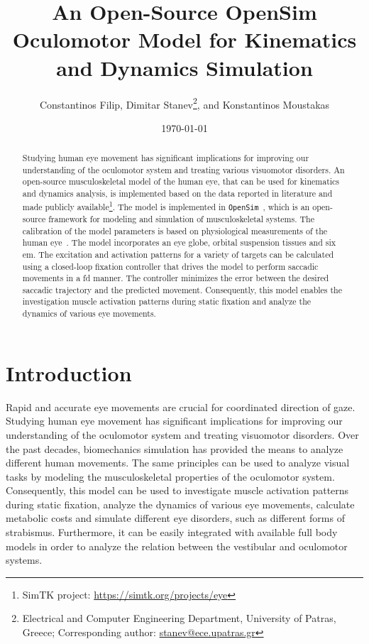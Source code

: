 \documentclass[11pt,a4paper,draft=false]{report}
\title{An Open-Source OpenSim Oculomotor Model for Kinematics and Dynamics
  Simulation}
\author{Constantinos Filip, Dimitar Stanev\footnote{Electrical and Computer
    Engineering Department, University of Patras, Greece; Corresponding
    author: \url{stanev@ece.upatras.gr}}, and Konstantinos Moustakas}
\date{\today}
\begin{document}

\maketitle

\begin{abstract}
  Studying human eye movement has significant implications for improving our
  understanding of the oculomotor system and treating various visuomotor
  disorders. An open-source musculoskeletal model of the human eye, that can be
  used for kinematics and dynamics analysis, is implemented based on the data
  reported in literature and made publicly available\footnote{SimTK project:
    \url{https://simtk.org/projects/eye}}. The model is implemented in
  \texttt{OpenSim}~\cite{Delp2007}, which is an open-source framework for
  modeling and simulation of musculoskeletal systems. The calibration of the
  model parameters is based on physiological measurements of the human
  eye~\cite{Iskander2018}. The model incorporates an eye globe, orbital
  suspension tissues and six \gls{em}. The excitation and activation patterns
  for a variety of targets can be calculated using a closed-loop fixation
  controller that drives the model to perform saccadic movements in a \gls{fd}
  manner. The controller minimizes the error between the desired saccadic
  trajectory and the predicted movement. Consequently, this model enables the
  investigation muscle activation patterns during static fixation and analyze
  the dynamics of various eye movements.
\end{abstract}

\section*{Introduction}\label{sec:introduction}

Rapid and accurate eye movements are crucial for coordinated direction of
gaze. Studying human eye movement has significant implications for improving our
understanding of the oculomotor system and treating visuomotor disorders. Over
the past decades, biomechanics simulation has provided the means to analyze
different human movements. The same principles can be used to analyze visual
tasks by modeling the musculoskeletal properties of the oculomotor
system. Consequently, this model can be used to investigate muscle activation
patterns during static fixation, analyze the dynamics of various eye movements,
calculate metabolic costs and simulate different eye disorders, such as
different forms of strabismus. Furthermore, it can be easily integrated with
available full body models in order to analyze the relation between the
vestibular and oculomotor systems.
\end{document}
